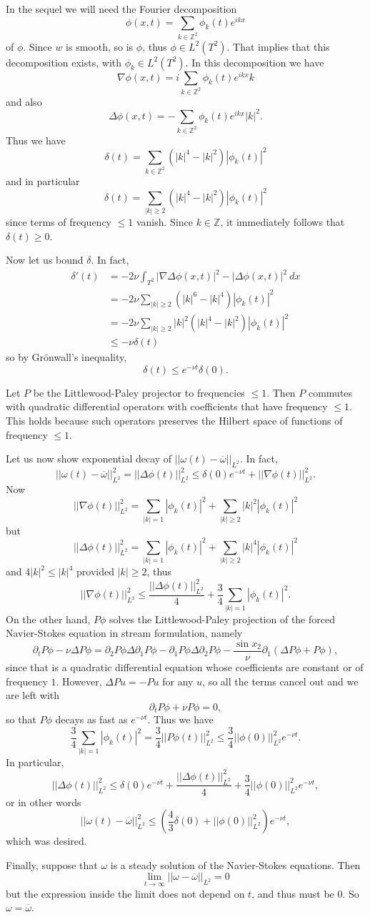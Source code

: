 \documentclass[10pt]{article}
\newcommand{\ZZ}{\mathbb{Z}}
\theoremstyle{definition}
\begin{document}
In the sequel we will need the Fourier decomposition
$$\phi(x, t) = \sum_{k \in \ZZ^2} \phi_k(t) e^{ikx}$$
of $\phi$. Since $w$ is smooth, so is $\phi$, thus $\phi \in L^2(T^2)$.
That implies that this decomposition exists, with $\phi_k \in L^2(T^2)$.
In this decomposition we have
$$\nabla \phi(x, t) = i\sum_{k \in \ZZ^2} \phi_k(t) e^{ikx} k$$
and also
$$\Delta \phi(x, t) = -\sum_{k \in \ZZ^2} \phi_k(t) e^{ikx} |k|^2.$$
Thus we have
$$\delta(t) = \sum_{k \in \ZZ^2} (|k|^4 - |k|^2) |\phi_k(t)|^2$$
and in particular
$$\delta(t) = \sum_{|k| \geq 2} (|k|^4 - |k|^2) |\phi_k(t)|^2$$
since terms of frequency $\leq 1$ vanish.
Since $k \in \ZZ$, it immediately follows that $\delta(t) \geq 0$.

Now let us bound $\delta$. In fact,
\begin{align*}
\delta'(t) &= -2\nu \int_{T^2} |\nabla \Delta \phi(x, t)|^2 - |\Delta \phi(x, t)|^2 ~dx\\
&= -2\nu \sum_{|k| \geq 2} (|k|^6 - |k|^4) |\phi_k(t)|^2\\
&= -2\nu \sum_{|k| \geq 2} |k|^2 (|k|^4 - |k|^2) |\phi_k(t)|^2\\
&\leq -\nu \delta(t)
\end{align*}
so by Gr\"onwall's inequality,
$$\delta(t) \leq e^{-\nu t} \delta(0).$$

Let $P$ be the Littlewood-Paley projector to frequencies $\leq 1$.
Then $P$ commutes with quadratic differential operators with coefficients that have frequency $\leq 1$.
This holds because such operators preserves the Hilbert space of functions of frequency $\leq 1$.

Let us now show exponential decay of $||\omega(t) - \overline \omega||_{L^2}$.
In fact,
$$||\omega(t) - \overline \omega||_{L^2}^2 = ||\Delta \phi(t)||_{L^2}^2 \leq \delta(0) e^{-\nu t} + ||\nabla \phi(t)||_{L^2}^2.$$
Now
$$||\nabla \phi(t)||_{L^2}^2 = \sum_{|k| = 1} |\phi_k(t)|^2 + \sum_{|k| \geq 2} |k|^2 |\phi_k(t)|^2$$
but
$$||\Delta \phi(t)||_{L^2}^2 = \sum_{|k| = 1} |\phi_k(t)|^2 + \sum_{|k| \geq 2} |k|^4 |\phi_k(t)|^2$$
and $4|k|^2 \leq |k|^4$ provided $|k| \geq 2$, thus
$$||\nabla \phi(t)||_{L^2}^2 \leq \frac{||\Delta \phi(t)||_{L^2}^2}{4} + \frac{3}{4} \sum_{|k| = 1} |\phi_k(t)|^2.$$
On the other hand, $P\phi$ solves the Littlewood-Paley projection of the forced Navier-Stokes equation in stream formulation, namely
$$\partial_t P\phi - \nu \Delta P\phi = \partial_2 P\phi\Delta \partial_1 P\phi - \partial_1 P\phi\Delta \partial_2 P\phi - \frac{\sin x_2}{\nu}\partial_1(\Delta P\phi + P\phi),$$
since that is a quadratic differential equation whose coefficients are constant or of frequency $1$.
However, $\Delta Pu = -Pu$ for any $u$, so all the terms cancel out and we are left with
$$\partial_t P\phi + \nu P\phi = 0,$$
so that $P\phi$ decays as fast as $e^{-\nu t}$.
Thus we have
$$\frac{3}{4} \sum_{|k| = 1} |\phi_k(t)|^2 = \frac{3}{4} ||P\phi(t)||_{L^2}^2 \leq \frac{3}{4} ||\phi(0)||_{L^2}^2 e^{-\nu t}.$$
In particular,
$$||\Delta \phi(t)||_{L^2}^2 \leq \delta(0) e^{-\nu t} + \frac{||\Delta \phi(t)||_{L^2}^2}{4} + \frac{3}{4} ||\phi(0)||_{L^2}^2 e^{-\nu t},$$
or in other words
$$||\omega(t) - \overline \omega||_{L^2}^2 \leq \left(\frac{4}{3} \delta(0) + ||\phi(0)||_{L^2}^2\right) e^{-\nu t},$$
which was desired.

Finally, suppose that $\omega$ is a steady solution of the Navier-Stokes equations.
Then
$$\lim_{t \to \infty} ||\omega - \overline \omega||_{L^2} = 0$$
but the expression inside the limit does not depend on $t$, and thus must be $0$. So $\omega = \overline \omega$.
\end{document}
